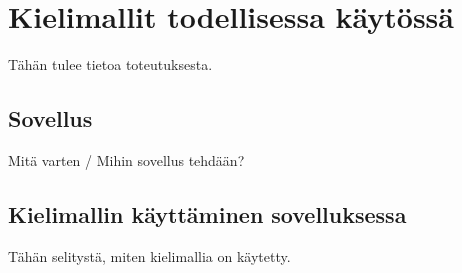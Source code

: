 \chapter{Kielimallit todellisessa käytössä}%
\label{ch:toteutus}

Tähän tulee tietoa toteutuksesta.

\section{Sovellus}

Mitä varten / Mihin sovellus tehdään?

\section{Kielimallin käyttäminen sovelluksessa}

Tähän selitystä, miten kielimallia on käytetty.
